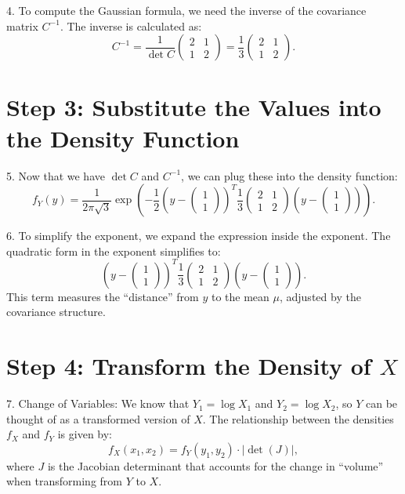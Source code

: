\documentclass[10pt,letterpaper]{article}
\begin{document}
4. To compute the Gaussian formula, we need the inverse of the covariance matrix \(C^{-1}\). The inverse is calculated as:
   \[
   C^{-1} = \frac{1}{\det C} \begin{pmatrix} 2 & 1 \\ 1 & 2 \end{pmatrix} = \frac{1}{3} \begin{pmatrix} 2 & 1 \\ 1 & 2 \end{pmatrix}.
   \]

\section*{Step 3: Substitute the Values into the Density Function}
5. Now that we have \(\det C\) and \(C^{-1}\), we can plug these into the density function:
   \[
   f_Y(y) = \frac{1}{2\pi \sqrt{3}} \exp\left(-\frac{1}{2} (y - \begin{pmatrix} 1 \\ 1 \end{pmatrix})^T \frac{1}{3} \begin{pmatrix} 2 & 1 \\ 1 & 2 \end{pmatrix} (y - \begin{pmatrix} 1 \\ 1 \end{pmatrix})\right).
   \]

6. To simplify the exponent, we expand the expression inside the exponent. The quadratic form in the exponent simplifies to:
   \[
   (y - \begin{pmatrix} 1 \\ 1 \end{pmatrix})^T \frac{1}{3} \begin{pmatrix} 2 & 1 \\ 1 & 2 \end{pmatrix} (y - \begin{pmatrix} 1 \\ 1 \end{pmatrix}).
   \]
   This term measures the “distance” from \(y\) to the mean \(\mu\), adjusted by the covariance structure.

\section*{Step 4: Transform the Density of \(X\)}
7. Change of Variables: We know that \(Y_1 = \log X_1\) and \(Y_2 = \log X_2\), so \(Y\) can be thought of as a transformed version of \(X\). The relationship between the densities \(f_X\) and \(f_Y\) is given by:
   \[
   f_X(x_1, x_2) = f_Y(y_1, y_2) \cdot \left| \det(J) \right|,
   \]
   where \(J\) is the Jacobian determinant that accounts for the change in “volume” when transforming from \(Y\) to \(X\).
\end{document}
